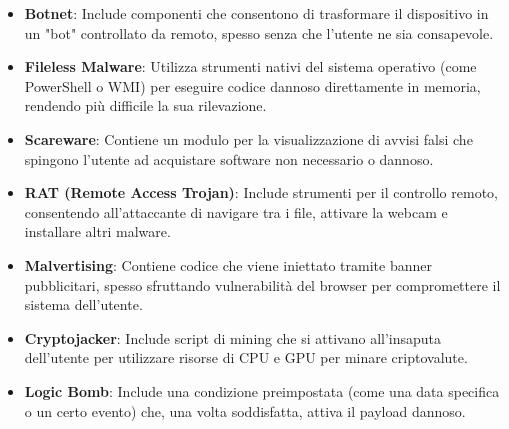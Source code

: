 \begin{itemize}
    \item \textbf{Botnet}: Include componenti che consentono di trasformare il dispositivo in un "bot" controllato da remoto, spesso senza che l'utente ne sia consapevole.
    \item \textbf{Fileless Malware}: Utilizza strumenti nativi del sistema operativo (come PowerShell o WMI) per eseguire codice dannoso direttamente in memoria, rendendo più difficile la sua rilevazione.
    \item \textbf{Scareware}: Contiene un modulo per la visualizzazione di avvisi falsi che spingono l'utente ad acquistare software non necessario o dannoso.
    \item \textbf{RAT (Remote Access Trojan)}: Include strumenti per il controllo remoto, consentendo all'attaccante di navigare tra i file, attivare la webcam e installare altri malware.
    \item \textbf{Malvertising}: Contiene codice che viene iniettato tramite banner pubblicitari, spesso sfruttando vulnerabilità del browser per compromettere il sistema dell'utente.
    \item \textbf{Cryptojacker}: Include script di mining che si attivano all'insaputa dell'utente per utilizzare risorse di CPU e GPU per minare criptovalute.
    \item \textbf{Logic Bomb}: Include una condizione preimpostata (come una data specifica o un certo evento) che, una volta soddisfatta, attiva il payload dannoso.
\end{itemize}

